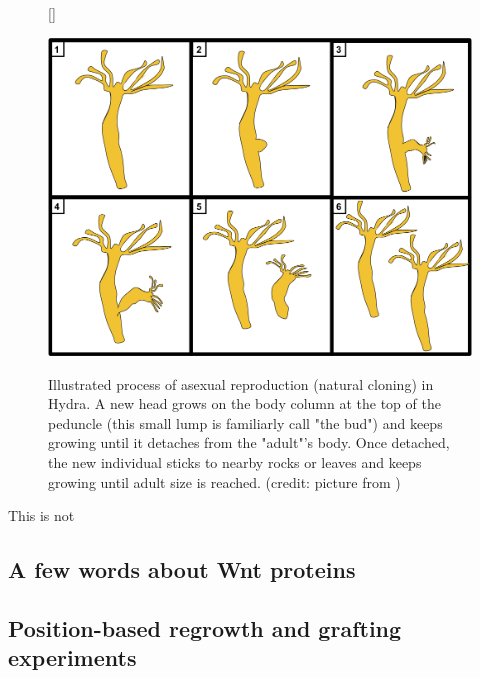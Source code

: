 
\begin{figure}[h]
	[\FBwidth]
	{\caption{Illustrated process of asexual reproduction (natural cloning) in Hydra. A new head grows on the body column at the top of the peduncle (this small lump is familiarly call "the bud") and keeps growing until it detaches from the "adult"'s body. Once detached, the new individual sticks to nearby rocks or leaves and keeps growing until adult size is reached. (credit: picture from \cite{Neupane2022})}\label{fig:hydrareprod}}
	{\includegraphics[width=0.9\linewidth]{figures/hydra_asexual.png}}
\end{figure}

This is not \cite{Ghaskadbi2020}

  

\subsection{A few words about Wnt proteins}


\subsection{Position-based regrowth and grafting experiments}